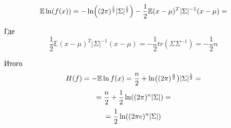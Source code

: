 \documentclass[11pt,a4paper]{article}
\newcommand{\lnb}[1]{%
  \ln\mleft(#1\mright)%
}
\begin{document}
$$ \mathbb{E} \lnb{f(x)} = -\lnb{(2\pi)^{\frac{1}{2}} |\Sigma|^{\frac{1}{2}}} - \frac{1}{2} \mathbb{E} (x-\mu)^T |\Sigma|^{-1} (x - \mu) = $$

Где $$ \frac{1}{2} \mathbb{E} (x-\mu)^T |\Sigma|^{-1} (x - \mu) =  -\frac{1}{2} tr(\Sigma \Sigma^{-1}) = -\frac{1}{2}n$$

Итого
$$ H(f) =  -\mathbb{E}\ln f(x)  = \frac{n}{2} + \lnb{(2\pi)^{\frac{n}{2}}} |\Sigma|^{\frac{1}{2}} =$$
$$ = \frac{n}{2} + \frac{1}{2} \lnb {(2\pi)^n |\Sigma|} = $$
$$ = \frac{1}{2} \lnb{(2\pi e)^n |\Sigma|} $$
\end{document}
